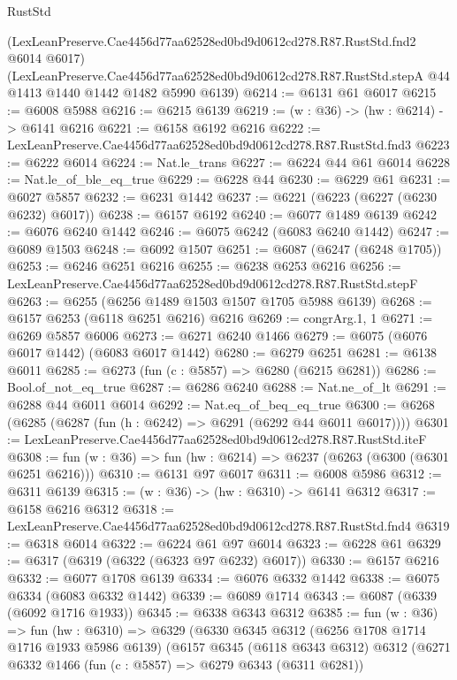 \begin{lexlean}{RustStd}
\begin{coremodule}
{{    (LexLeanPreserve.Cae4456d77aa62528ed0bd9d0612cd278.R87.RustStd.fnd2 @6014 @6017)
    (LexLeanPreserve.Cae4456d77aa62528ed0bd9d0612cd278.R87.RustStd.stepA
      @44
      @1413
      @1440
      @1442
      @1482
      @5990
      @6139)
@6214 := @6131 @61 @6017
@6215 := @6008 @5988
@6216 := @6215 @6139
@6219 := (w : @36) -> (hw : @6214) -> @6141 @6216
@6221 := @6158 @6192 @6216
@6222 := LexLeanPreserve.Cae4456d77aa62528ed0bd9d0612cd278.R87.RustStd.fnd3
@6223 := @6222 @6014
@6224 := Nat.le_trans
@6227 := @6224 @44 @61 @6014
@6228 := Nat.le_of_ble_eq_true
@6229 := @6228 @44
@6230 := @6229 @61
@6231 := @6027 @5857
@6232 := @6231 @1442
@6237 := @6221 (@6223 (@6227 (@6230 @6232) @6017))
@6238 := @6157 @6192
@6240 := @6077 @1489 @6139
@6242 := @6076 @6240 @1442
@6246 := @6075 @6242 (@6083 @6240 @1442)
@6247 := @6089 @1503
@6248 := @6092 @1507
@6251 := @6087 (@6247 (@6248 @1705))
@6253 := @6246 @6251 @6216
@6255 := @6238 @6253 @6216
@6256 := LexLeanPreserve.Cae4456d77aa62528ed0bd9d0612cd278.R87.RustStd.stepF
@6263 := @6255 (@6256 @1489 @1503 @1507 @1705 @5988 @6139)
@6268 := @6157 @6253 (@6118 @6251 @6216) @6216
@6269 := congrArg.{1, 1}
@6271 := @6269 @5857 @6006
@6273 := @6271 @6240 @1466
@6279 := @6075 (@6076 @6017 @1442) (@6083 @6017 @1442)
@6280 := @6279 @6251
@6281 := @6138 @6011
@6285 := @6273 (fun (c : @5857) => @6280 (@6215 @6281))
@6286 := Bool.of_not_eq_true
@6287 := @6286 @6240
@6288 := Nat.ne_of_lt
@6291 := @6288 @44 @6011 @6014
@6292 := Nat.eq_of_beq_eq_true
@6300 := @6268 (@6285 (@6287 (fun (h : @6242) => @6291 (@6292 @44 @6011 @6017))))
@6301 := LexLeanPreserve.Cae4456d77aa62528ed0bd9d0612cd278.R87.RustStd.iteF
@6308 := fun (w : @36) => fun (hw : @6214) => @6237 (@6263 (@6300 (@6301 @6251 @6216)))
@6310 := @6131 @97 @6017
@6311 := @6008 @5986
@6312 := @6311 @6139
@6315 := (w : @36) -> (hw : @6310) -> @6141 @6312
@6317 := @6158 @6216 @6312
@6318 := LexLeanPreserve.Cae4456d77aa62528ed0bd9d0612cd278.R87.RustStd.fnd4
@6319 := @6318 @6014
@6322 := @6224 @61 @97 @6014
@6323 := @6228 @61
@6329 := @6317 (@6319 (@6322 (@6323 @97 @6232) @6017))
@6330 := @6157 @6216
@6332 := @6077 @1708 @6139
@6334 := @6076 @6332 @1442
@6338 := @6075 @6334 (@6083 @6332 @1442)
@6339 := @6089 @1714
@6343 := @6087 (@6339 (@6092 @1716 @1933))
@6345 := @6338 @6343 @6312
@6385 := fun (w : @36) =>
  fun (hw : @6310) =>
  @6329
    (@6330
      @6345
      @6312
      (@6256 @1708 @1714 @1716 @1933 @5986 @6139)
      (@6157
        @6345
        (@6118 @6343 @6312)
        @6312
        (@6271
          @6332
          @1466
          (fun (c : @5857) => @6279 @6343 (@6311 @6281))
}}
\end{coremodule}
\end{lexlean}
